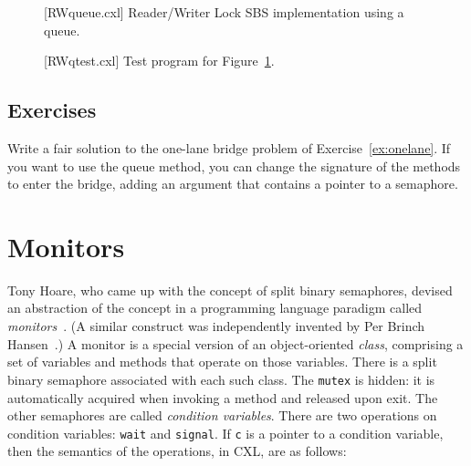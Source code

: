 \documentclass{report}
\newenvironment{code}{
\tcolorbox
}{
\endtcolorbox
}
\begin{document}
\begin{figure}
\begin{code}
{\small
{}
}
\end{code}
\caption{[RWqueue.cxl] Reader/Writer Lock SBS implementation using a queue.}
\label{fig:RWqueue}
\end{figure}

\begin{figure}
\begin{code}
\end{code}
\caption{[RWqtest.cxl] Test program for Figure~\ref{fig:RWqueue}.}
\label{fig:RWqtest}
\end{figure}

\section*{Exercises}
\begin{problems}
\item Write a fair solution to the one-lane bridge problem of
Exercise~\ref{ex:onelane}.
If you want to use the queue method, you can change the signature of the
methods to enter the bridge, adding an argument that contains a pointer to a
semaphore.
\end{problems}

\chapter{Monitors}
\label{ch:monitors}

Tony Hoare, who came up with the concept of split binary semaphores, devised
an abstraction of the concept in a programming language paradigm called
\emph{monitors}~\cite{Hoare74}.
(A similar construct was independently invented by Per Brinch Hansen~\cite{BH73}.)
A monitor is a special version of an object-oriented \emph{class}, comprising
a set of variables and methods that operate on those variables.
There is a split binary semaphore associated with each such class.
The \texttt{mutex} is hidden: it is automatically acquired when invoking a
method and released upon exit.
The other semaphores are called \emph{condition variables}.
There are two operations on condition variables: \texttt{wait}
and
\texttt{signal}.
If \texttt{c} is a pointer to a condition variable, then the semantics of the
operations, in CXL, are as follows:
\end{document}
